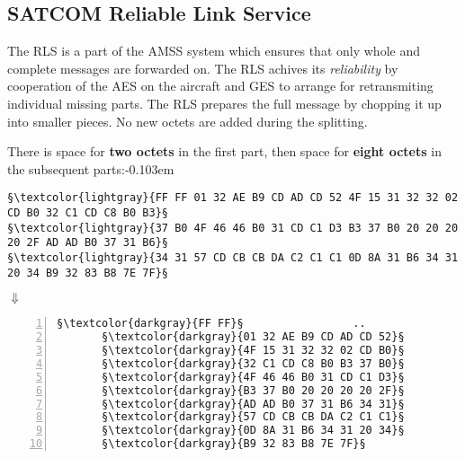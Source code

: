 \documentclass[tikz,a4paper,12pt]{article}
\begin{document}
\subsection{SATCOM Reliable Link Service}

The \gls{RLS} is a part of the \gls{AMSS} system which ensures that
only whole and complete messages are forwarded on.  The RLS achives
its \emph{reliability} by cooperation of the \gls{AES} on the aircraft and \gls{GES}
to arrange for retransmiting individual missing parts.  The \gls{RLS}
prepares the full message by chopping it up into smaller pieces.  No
new octets are added during the splitting.

{There is space for \textbf{two octets} in the first part, then space for \textbf{eight
octets} in the subsequent parts:\unskip\parfillskip-0.103em \par}\vspace{0.5em}

\begin{lstlisting}[language=ACARS]
§\textcolor{lightgray}{FF FF 01 32 AE B9 CD AD CD 52 4F 15 31 32 32 02 CD B0 32 C1 CD C8 B0 B3}§
§\textcolor{lightgray}{37 B0 4F 46 46 B0 31 CD C1 D3 B3 37 B0 20 20 20 20 2F AD AD B0 37 31 B6}§
§\textcolor{lightgray}{34 31 57 CD CB CB DA C2 C1 C1 0D 8A 31 B6 34 31 20 34 B9 32 83 B8 7E 7F}§
\end{lstlisting}

\vspace{-0.75em}\hspace{12.3em}$\Downarrow $\hspace{8.67em}\raisebox{0.8em}{$\Downarrow $}\vspace{0.1em}
\begin{lstlisting}[language=SATCOM,numbers=left]
                         §\textcolor{darkgray}{FF FF}§                 ..
       §\textcolor{darkgray}{01 32 AE B9 CD AD CD 52}§           .2.9M-MR
       §\textcolor{darkgray}{4F 15 31 32 32 02 CD B0}§           O.122.M0
       §\textcolor{darkgray}{32 C1 CD C8 B0 B3 37 B0}§           2AMH0370
       §\textcolor{darkgray}{4F 46 46 B0 31 CD C1 D3}§           OFF01MAS
       §\textcolor{darkgray}{B3 37 B0 20 20 20 20 2F}§           370    /
       §\textcolor{darkgray}{AD AD B0 37 31 B6 34 31}§           --071641
       §\textcolor{darkgray}{57 CD CB CB DA C2 C1 C1}§           WMKKZBAA
       §\textcolor{darkgray}{0D 8A 31 B6 34 31 20 34}§           ..1641 4
       §\textcolor{darkgray}{B9 32 83 B8 7E 7F}§                 92.8..
\end{lstlisting}
\end{document}
